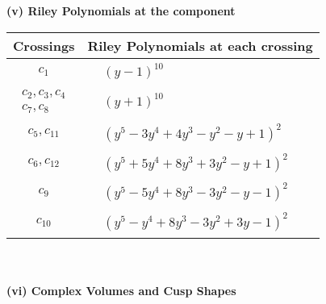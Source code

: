 \documentclass[1p]{elsarticle_modified}
\theoremstyle{definition}
\begin{document}
\newpage\renewcommand{\arraystretch}{1}
\flushleft \textbf{(v) Riley Polynomials at the component}\newline \\
\begin{tabular}{m{50pt}|m{274pt}}
Crossings & \hspace{64pt}Riley Polynomials at each crossing \\
\hline $$\begin{aligned}c_{1}\end{aligned}$$&$\begin{aligned}
&(y-1)^{10}
\end{aligned}$\\
\hline $$\begin{aligned}c_{2},c_{3},c_{4}\\c_{7},c_{8}\end{aligned}$$&$\begin{aligned}
&(y+1)^{10}
\end{aligned}$\\
\hline $$\begin{aligned}c_{5},c_{11}\end{aligned}$$&$\begin{aligned}
&(y^5-3 y^4+4 y^3- y^2- y+1)^2
\end{aligned}$\\
\hline $$\begin{aligned}c_{6},c_{12}\end{aligned}$$&$\begin{aligned}
&(y^5+5 y^4+8 y^3+3 y^2- y+1)^2
\end{aligned}$\\
\hline $$\begin{aligned}c_{9}\end{aligned}$$&$\begin{aligned}
&(y^5-5 y^4+8 y^3-3 y^2- y-1)^2
\end{aligned}$\\
\hline $$\begin{aligned}c_{10}\end{aligned}$$&$\begin{aligned}
&(y^5- y^4+8 y^3-3 y^2+3 y-1)^2
\end{aligned}$\\
\hline
\end{tabular}\\~\\
\newpage\flushleft \textbf{(vi) Complex Volumes and Cusp Shapes}
\end{document}
